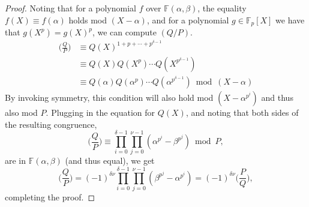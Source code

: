 \begin{theorem}
\begin{proof}
    Noting that for a polynomial ${f}$ over ${\mathbb{F}(\alpha,\beta)}$, the equality ${f(X) \equiv f(\alpha)}$ holds mod ${(X-\alpha)}$, and for a polynomial ${g \in \mathbb{F}_{p}[X]}$ we have that ${g(X^{p})=g(X)^{p}}$, we can compute ${(Q/P)}$.
    \begin{align*} \bigg( \frac{Q}{P} \bigg) & \equiv Q(X)^{1+p+\cdots+p^{\delta-1}} \\ & \equiv Q(X)Q(X^{p}) \cdots Q(X^{p^{\delta -1}}) \\ & \equiv Q(\alpha)Q(\alpha^{p}) \cdots Q(\alpha^{p^{\delta-1}}) \bmod (X-\alpha) \end{align*}
    By invoking symmetry, this condition will also hold mod ${(X-\alpha^{p^{i}})}$ and thus also mod ${P}$. Plugging in the equation for $Q(X)$, and noting that both sides of the resulting congruence,
    \begin{equation}
      \bigg( \frac{Q}{P} \bigg) \equiv \prod_{i=0}^{\delta -1} \prod_{j=0}^{\nu -1} (\alpha^{p^{i}} - \beta^{p^{j}}) \bmod P,  
    \end{equation}
    are in ${\mathbb{F}(\alpha,\beta)}$ (and thus equal), we get
    \begin{equation}
      \bigg( \frac{Q}{P} \bigg) = (-1)^{\delta \nu} \prod_{i=0}^{\delta -1} \prod_{j=0}^{\nu -1} (\beta^{p^{j}} - \alpha^{p^{i}}) = (-1)^{\delta \nu} \bigg( \frac{P}{Q} \bigg),  
    \end{equation}
    completing the proof.
  \end{proof}
\end{theorem}


